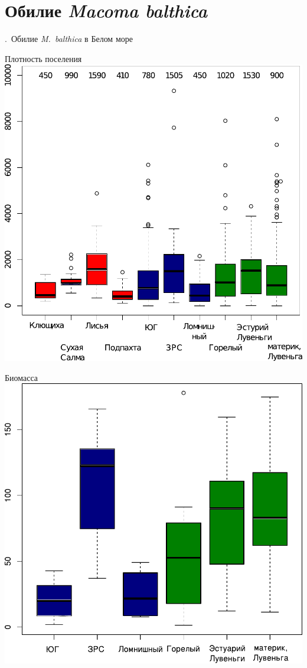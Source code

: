\documentclass[aspectratio=169, xcolor=table]{beamer}
\begin{document}
		\section[Обилие]{Обилие {\it Macoma balthica}}
\begin{frame}{\insertpagenumber.\ Обилие {\it M.~balthica} в Белом море}
	\begin{minipage}[t]{.49\linewidth}
		\begin{center}
		{\footnotesize Плотность поселения}
			\includegraphics[width=.9\textwidth]{N2_area_White2.pdf}
		\end{center}
	\end{minipage}
%
	\begin{minipage}[t]{.49\linewidth}
		\begin{center}
		{\footnotesize Биомасса}
			\includegraphics[width=.9\textwidth]{B_Kanda_ru2.pdf}
		\end{center}
	\end{minipage}



\end{frame}
\end{document}
